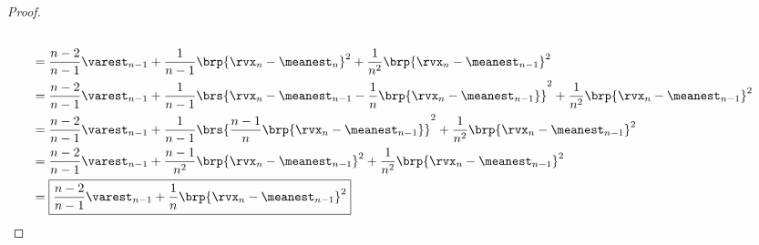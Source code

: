\begin{proof}
\begin{align*}
   \\&= \frac{n-2}{n-1} \varest_{n-1}
      + \frac{1}{n-1} \brp{ \rvx_n - \meanest_n }^2
      + \frac{1}{n^2} \brp{ \rvx_n - \meanest_{n-1} }^2
   \\&= \frac{n-2}{n-1} \varest_{n-1}
      + \frac{1}{n-1} \brs{ \rvx_n - \meanest_{n-1} - \frac{1}{n}\brp{ \rvx_n - \meanest_{n-1} } }^2
      + \frac{1}{n^2} \brp{ \rvx_n - \meanest_{n-1} }^2
   \\&= \frac{n-2}{n-1} \varest_{n-1}
      + \frac{1}{n-1} \brs{ \frac{n-1}{n} \brp{ \rvx_n - \meanest_{n-1} } }^2
      + \frac{1}{n^2} \brp{ \rvx_n - \meanest_{n-1} }^2
   \\&= \frac{n-2}{n-1} \varest_{n-1}
      + \frac{n-1}{n^2} \brp{ \rvx_n - \meanest_{n-1} }^2
      + \frac{  1}{n^2} \brp{ \rvx_n - \meanest_{n-1} }^2
   \\&= \boxed{
          \frac{n-2}{n-1} \varest_{n-1}
        + \frac{1}{n} \brp{ \rvx_n - \meanest_{n-1} }^2
        }
\end{align*}
\end{proof}

